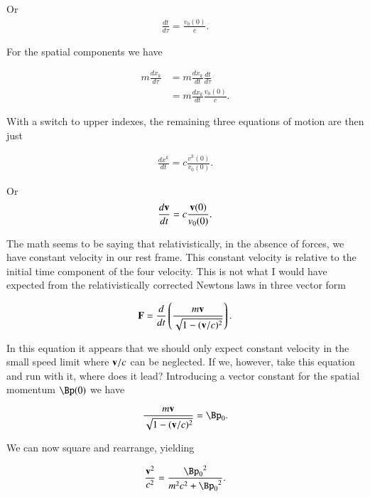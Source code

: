 Or 
\begin{align}\label{eqn:constFourMomentum:qqq8}
\frac{dt}{d\tau} = \frac{v_0(0)}{c}.
\end{align}

For the spatial components we have

\begin{align*}
m \frac{d x_k}{d\tau} 
&=
m \frac{d x_k}{dt}  \frac{dt}{d\tau} \\
&=
m \frac{d x_k}{dt}  \frac{v_0(0)}{c}.
\end{align*}

With a switch to upper indexes, the remaining three equations of motion are then just

\begin{align}\label{eqn:constFourMomentum:qqq10}
\frac{d x^k}{dt} = c \frac{ v^k(0) }{ v_0(0) }.
\end{align}

Or
\begin{align}\label{eqn:constFourMomentum:qqq10a}
\frac{d \mathbf{v}}{dt} = c \frac{ \mathbf{v}(0) }{ v_0(0) }.
\end{align}

The math seems to be saying that relativistically, in the absence of forces, we have constant velocity in our rest frame.  This constant velocity is relative to the initial time component of the four velocity.  This is not what I would have expected from the relativistically corrected Newtons laws in three vector form

\begin{align}\label{eqn:constFourMomentum:qqq11}
\mathbf{F} = \frac{d}{dt}\left( \frac{m \mathbf{v}}{\sqrt{1 - (\mathbf{v}/c)^2}} \right).
\end{align}

In this equation it appears that we should only expect constant velocity in the small speed limit where $\mathbf{v}/c$ can be neglected.  If we, however, take this equation and run with it, where does it lead?  Introducing a vector constant for the spatial momentum $\Bp(0)$ we have

\begin{align}\label{eqn:constFourMomentum:qqq12}
\frac{m \Bv}{\sqrt{1 - (\Bv/c)^2}} = \Bp_0.
\end{align}

We can now square and rearrange, yielding

\begin{align}\label{eqn:constFourMomentum:qqq13}
\frac{\Bv^2}{c^2} = \frac{ {\Bp_0}^2 } { m^2 c^2 + {\Bp_0}^2 }.
\end{align}

